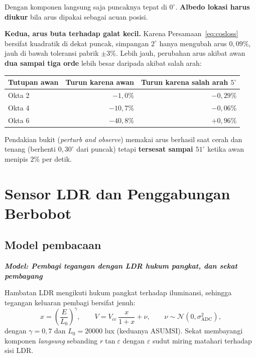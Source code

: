 \documentclass[11pt,a4paper]{article}
\newcommand{\degg}{^\circ}
\newcommand{\model}[1]{\textbf{\textit{Model: #1}}}
\begin{document}
Dengan komponen langsung saja puncaknya tepat di $0\degg$. \textbf{Albedo lokasi harus diukur} bila arus
dipakai sebagai acuan posisi.

\textbf{Kedua, arus buta terhadap galat kecil.} Karena Persamaan~\eqref{eq:cosloss} bersifat kuadratik di
dekat puncak, simpangan $2\degg$ hanya mengubah arus $0{,}09\%$, jauh di bawah toleransi pabrik $\pm3\%$.
Lebih jauh, perubahan arus akibat awan \textbf{dua sampai tiga orde} lebih besar daripada akibat salah arah:

\begin{longtable}{l r r}
\toprule
\textbf{Tutupan awan} & \textbf{Turun karena awan} & \textbf{Turun karena salah arah $5\degg$} \\
\midrule
Okta 2 & $-1{,}0\%$ & $-0{,}29\%$ \\
Okta 4 & $-10{,}7\%$ & $-0{,}06\%$ \\
Okta 6 & $-40{,}8\%$ & $+0{,}96\%$ \\
\bottomrule
\end{longtable}

Pendakian bukit (\emph{perturb and observe}) memakai arus berhasil saat cerah dan tenang (berhenti
$0{,}30\degg$ dari puncak) tetapi \textbf{tersesat sampai $51\degg$} ketika awan menipis $2\%$ per detik.

\section{Sensor LDR dan Penggabungan Berbobot}
\label{sec:fusi}

\subsection{Model pembacaan}

\model{Pembagi tegangan dengan LDR hukum pangkat, dan sekat pembayang}

Hambatan LDR mengikuti hukum pangkat terhadap iluminansi, sehingga tegangan keluaran pembagi bersifat jenuh:
\begin{equation}
x = \left( \frac{E}{L_0} \right)^{\gamma}, \qquad
V = V_{cc}\,\frac{x}{1+x} + \nu, \qquad \nu \sim \mathcal{N}(0, \sigma_{\mathrm{ADC}}^2),
\end{equation}
dengan $\gamma = 0{,}7$ dan $L_0 = 20000$ lux (keduanya ASUMSI). Sekat membayangi komponen \emph{langsung}
sebanding $r\tan\varepsilon$ dengan $\varepsilon$ sudut miring matahari terhadap sisi LDR.
\end{document}
